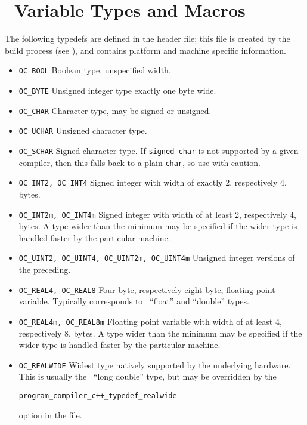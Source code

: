 \section{\OOMMF\ Variable Types and Macros}\label{sec:vartypes}
{%
The following typedefs are defined in the
 header file; this file is
created by the  build process (see
), and contains platform and machine
specific information.
\newcommand{\gbs}{\hspace{0.5em}}
\begin{itemize}
\item{\texttt{OC\_BOOL}} \gbs Boolean type, unspecified width.
\item{\texttt{OC\_BYTE}} \gbs Unsigned integer type exactly one byte wide.
\item{\texttt{OC\_CHAR}} \gbs Character type, may be signed or unsigned.
\item{\texttt{OC\_UCHAR}} \gbs Unsigned character type.
\item{\texttt{OC\_SCHAR}} \gbs Signed character type.  If \texttt{signed char}
  is not supported by a given compiler, then this falls back to a
  plain \texttt{char}, so use with caution.
\item{\texttt{OC\_INT2, OC\_INT4}} \gbs Signed integer with width of
  exactly 2, respectively 4, bytes.
\item{\texttt{OC\_INT2m, OC\_INT4m}} \gbs Signed integer with width of
  at least 2, respectively 4, bytes.  A type wider than the minimum
  may be specified if the wider type is handled faster by the
  particular machine.
\item{\texttt{OC\_UINT2, OC\_UINT4, OC\_UINT2m, OC\_UINT4m}} \gbs Unsigned
  integer versions of the preceding.
\item{\texttt{OC\_REAL4, OC\_REAL8}} \gbs Four byte, respectively eight
  byte, floating point variable.  Typically corresponds to \Cplusplus\
  ``float'' and ``double'' types.
\item{\texttt{OC\_REAL4m, OC\_REAL8m}} \gbs Floating point variable with
  width of at least 4, respectively 8, bytes.  A type wider than the minimum
  may be specified if the wider type is handled faster by the
  particular machine.
\item{\texttt{OC\_REALWIDE}} \gbs Widest type natively supported by the
  underlying hardware.  This is usually the \Cplusplus\ ``long
  double'' type, but may be overridden by the
\begin{center}
  \texttt{program\_compiler\_c++\_typedef\_realwide}
\end{center}
  option in the  file.
\end{itemize}

}
